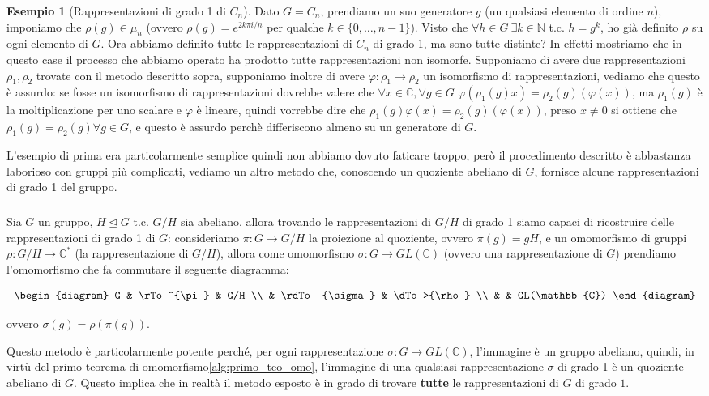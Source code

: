 \documentclass[11pt]{article}
\theoremstyle{plain}
\theoremstyle{definition}
\newtheorem{exmp}{Esempio}[section]
\theoremstyle{remark}
\newcommand{\C}{\mathbb{C}}
\newcommand{\N}{\mathbb{N}}
\newcommand{\tridiag}[6]{
	\[
	  \begin{diagram}
	  #1 & \rTo^{#2}  & #3        \\
	     & \rdTo_{#6} & \dTo>{#4}   \\
	     &          & #5
	  \end{diagram}
	\]
}
\begin{document}
\begin{exmp}[Rappresentazioni di grado 1 di $C_n$]
Dato $G=C_n$, prendiamo un suo generatore $g$ (un qualsiasi elemento di ordine $n$), imponiamo che $\rho(g)\in \mu_n$ (ovvero $\rho(g)=e^{2k\pi i/n}$ per qualche $k\in \{0,\ldots,n-1\}$). Visto che $\forall h\in G\ \exists k\in \N$ t.c. $h=g^k$, ho già definito $\rho$ su ogni elemento di $G$.\newline
Ora abbiamo definito tutte le rappresentazioni di $C_n$ di grado 1, ma sono tutte distinte? In effetti mostriamo che in questo case il processo che abbiamo operato ha prodotto tutte rappresentazioni non isomorfe. Supponiamo di avere due rappresentazioni $\rho_1, \rho_2$ trovate con il metodo descritto sopra, supponiamo inoltre di avere $\varphi:\rho_1\to\rho_2$ un isomorfismo di rappresentazioni, vediamo che questo è assurdo: se fosse un isomorfismo di rappresentazioni dovrebbe valere che $\forall x\in \C, \forall g\in G$ $\varphi( \rho_1(g)x ) = \rho_2(g)( \varphi(x) )$, ma $\rho_1(g)$ è la moltiplicazione per uno scalare e $\varphi$ è lineare, quindi vorrebbe dire che $\rho_1(g)\varphi( x ) = \rho_2(g)( \varphi(x) )$, preso $x\neq 0$ si ottiene che $\rho_1(g)=\rho_2(g)\forall g\in G$, e questo è assurdo perchè differiscono almeno su un generatore di $G$.
\end{exmp}

L'esempio di prima era particolarmente semplice quindi non abbiamo dovuto faticare troppo, però il procedimento descritto è abbastanza laborioso con gruppi più complicati, vediamo un altro metodo che, conoscendo un quoziente abeliano di $G$, fornisce alcune rappresentazioni di grado 1 del gruppo.
\subparagraph{}
Sia $G$ un gruppo, $H\trianglelefteq G$ t.c. $G/H$ sia abeliano, allora trovando le rappresentazioni di $G/H$ di grado 1 siamo capaci di ricostruire delle rappresentazioni di grado 1 di $G$: consideriamo $\pi:G\to G/H$ la proiezione al quoziente, ovvero $\pi(g)=gH$, e un omomorfismo di gruppi $\rho:G/H\to \C^*$ (la rappresentazione di $G/H$), allora come omomorfismo $\sigma:G\to GL(\C)$ (ovvero una rappresentazione di $G$) prendiamo l'omomorfismo che fa commutare il seguente diagramma:
\tridiag G \pi {G/H} \rho {GL(\C)} \sigma
ovvero $\sigma(g)=\rho(\pi(g))$.

Questo metodo è particolarmente potente perché, per ogni rappresentazione $\sigma:G\to GL(\C)$, l'immagine è un gruppo abeliano, quindi, in virtù del primo teorema di omomorfismo\eqref{alg:primo_teo_omo}, l'immagine di una qualsiasi rappresentazione $\sigma$ di grado 1 è un quoziente abeliano di $G$.
Questo implica che in realtà il metodo esposto è in grado di trovare \textbf{tutte} le rappresentazioni di $G$ di grado $1$.
\end{document}
